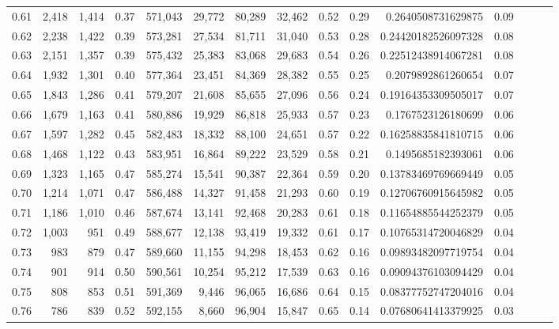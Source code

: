 \begin{tabular}{rrrrrrrrrrrrrrr}
0.61 &   2,418 &  1,414 &  0.37 &  571,043 &   29,772 &   80,289 &   32,462 &  0.52 &  0.29 &    0.2640508731629875 &      0.09 \\
0.62 &   2,238 &  1,422 &  0.39 &  573,281 &   27,534 &   81,711 &   31,040 &  0.53 &  0.28 &   0.24420182526097328 &      0.08 \\
0.63 &   2,151 &  1,357 &  0.39 &  575,432 &   25,383 &   83,068 &   29,683 &  0.54 &  0.26 &   0.22512438914067281 &      0.08 \\
0.64 &   1,932 &  1,301 &  0.40 &  577,364 &   23,451 &   84,369 &   28,382 &  0.55 &  0.25 &    0.2079892861260654 &      0.07 \\
0.65 &   1,843 &  1,286 &  0.41 &  579,207 &   21,608 &   85,655 &   27,096 &  0.56 &  0.24 &   0.19164353309505017 &      0.07 \\
0.66 &   1,679 &  1,163 &  0.41 &  580,886 &   19,929 &   86,818 &   25,933 &  0.57 &  0.23 &    0.1767523126180699 &      0.06 \\
0.67 &   1,597 &  1,282 &  0.45 &  582,483 &   18,332 &   88,100 &   24,651 &  0.57 &  0.22 &   0.16258835841810715 &      0.06 \\
0.68 &   1,468 &  1,122 &  0.43 &  583,951 &   16,864 &   89,222 &   23,529 &  0.58 &  0.21 &    0.1495685182393061 &      0.06 \\
0.69 &   1,323 &  1,165 &  0.47 &  585,274 &   15,541 &   90,387 &   22,364 &  0.59 &  0.20 &   0.13783469769669449 &      0.05 \\
0.70 &   1,214 &  1,071 &  0.47 &  586,488 &   14,327 &   91,458 &   21,293 &  0.60 &  0.19 &   0.12706760915645982 &      0.05 \\
0.71 &   1,186 &  1,010 &  0.46 &  587,674 &   13,141 &   92,468 &   20,283 &  0.61 &  0.18 &   0.11654885544252379 &      0.05 \\
0.72 &   1,003 &    951 &  0.49 &  588,677 &   12,138 &   93,419 &   19,332 &  0.61 &  0.17 &   0.10765314720046829 &      0.04 \\
0.73 &     983 &    879 &  0.47 &  589,660 &   11,155 &   94,298 &   18,453 &  0.62 &  0.16 &   0.09893482097719754 &      0.04 \\
0.74 &     901 &    914 &  0.50 &  590,561 &   10,254 &   95,212 &   17,539 &  0.63 &  0.16 &   0.09094376103094429 &      0.04 \\
0.75 &     808 &    853 &  0.51 &  591,369 &    9,446 &   96,065 &   16,686 &  0.64 &  0.15 &   0.08377752747204016 &      0.04 \\
0.76 &     786 &    839 &  0.52 &  592,155 &    8,660 &   96,904 &   15,847 &  0.65 &  0.14 &   0.07680641413379925 &      0.03 \\

\end{tabular}
